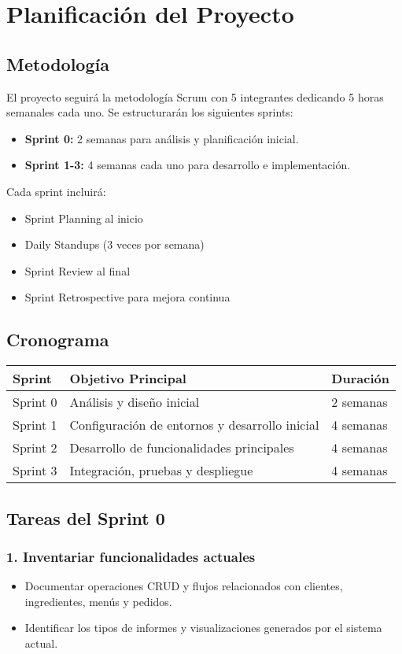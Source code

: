 \documentclass[12pt]{article}
\begin{document}
\section{Planificación del Proyecto}

\subsection{Metodología}
El proyecto seguirá la metodología Scrum con 5 integrantes dedicando 5 horas semanales cada uno. Se estructurarán los siguientes sprints:
\begin{itemize}
  \item \textbf{Sprint 0:} 2 semanas para análisis y planificación inicial.
  \item \textbf{Sprint 1-3:} 4 semanas cada uno para desarrollo e implementación.
\end{itemize}

Cada sprint incluirá:
\begin{itemize}
  \item Sprint Planning al inicio
  \item Daily Standups (3 veces por semana)
  \item Sprint Review al final
  \item Sprint Retrospective para mejora continua
\end{itemize}

\subsection{Cronograma}
\begin{longtable}{|l|l|l|}
\hline
\textbf{Sprint} & \textbf{Objetivo Principal} & \textbf{Duración} \\
\hline
Sprint 0 & Análisis y diseño inicial & 2 semanas \\
\hline
Sprint 1 & Configuración de entornos y desarrollo inicial & 4 semanas \\
\hline
Sprint 2 & Desarrollo de funcionalidades principales & 4 semanas \\
\hline
Sprint 3 & Integración, pruebas y despliegue & 4 semanas \\
\hline
\end{longtable}

\subsection{Tareas del Sprint 0}

\subsubsection{1. Inventariar funcionalidades actuales}
\begin{itemize}
  \item Documentar operaciones CRUD y flujos relacionados con clientes, ingredientes, menús y pedidos.
  \item Identificar los tipos de informes y visualizaciones generados por el sistema actual.
\end{itemize}
\end{document}
